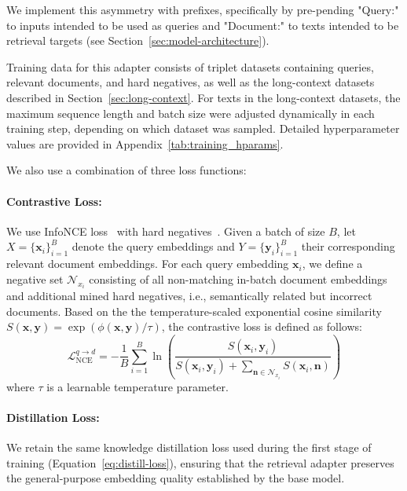 \documentclass[11pt]{article}
\begin{document}
We implement this asymmetry with prefixes, specifically by pre-pending "Query:" to inputs intended to be used as queries and "Document:" to texts intended to be retrieval targets (see Section~\ref{sec:model-architecture}).

Training data for this adapter consists of triplet datasets containing queries, relevant documents, and hard negatives, as well as the long-context datasets described in Section~\ref{sec:long-context}.
For texts in the long-context datasets, the maximum sequence length and batch size were adjusted dynamically in each training step, depending on which dataset was sampled. Detailed hyperparameter values are provided in Appendix~\ref{tab:training_hparams}.

We also use a combination of three loss functions:  

\paragraph{Contrastive Loss:}
We use InfoNCE loss~\cite{oord2018representation} with hard negatives~\cite{karpukhin2020dense}. 
Given a batch of size $B$, let $X = \{\bm{x}_i\}_{i=1}^B$ denote the query embeddings and $Y = \{\bm{y}_i\}_{i=1}^B$ their corresponding relevant document embeddings. 
For each query embedding $\bm{x}_i$, we define a negative set $\mathcal{N}_{x_i}$ consisting of all non-matching in-batch document embeddings and additional mined hard negatives, i.e., semantically related but incorrect documents.
Based on the the temperature-scaled exponential cosine similarity $S(\bm{x}, \bm{y}) = \exp(\phi(\bm{x}, \bm{y}) / \tau)$, the contrastive loss is defined as follows:
\begin{equation}
    \label{eq:infonce_loss}
    \mathcal{L}_{\text{NCE}}^{q \rightarrow d}  = - \frac{1}{B} \sum_{i=1}^{B} \ln \left( \frac{S(\mathbf{x}_i, \mathbf{y}_i)}{S(\mathbf{x}_i, \mathbf{y}_i) + \sum\limits_{\mathbf{n} \in \mathcal{N}_{x_i}} S(\mathbf{x}_i, \mathbf{n}) } \right)
\end{equation}
where $\tau$ is a learnable temperature parameter.

\paragraph{Distillation Loss:}
We retain the same knowledge distillation loss used during the first stage of training (Equation~\eqref{eq:distill-loss}), ensuring that the retrieval adapter preserves the general-purpose embedding quality established by the base model.
\end{document}
